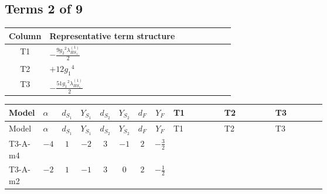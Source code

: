 \documentclass[8pt]{article}
\begin{document}
\begin{landscape}
\subsection*{Terms 2 of 9}
\begin{center}
\begin{tabular}{@{}c >{\raggedright\arraybackslash}p{0.82\linewidth}@{}}
\toprule
Column & Representative term structure \\
\midrule
T1 & \(\displaystyle -\frac{9 {g_2}^2 {\lambda_{HS_1}^{(1)}}}{2}\) \\
\midrule
T2 & \(\displaystyle +12 {g_1}^4\) \\
\midrule
T3 & \(\displaystyle -\frac{51 {g_1}^2 {\lambda_{HS_1}^{(1)}}}{2}\) \\
\midrule
\bottomrule
\end{tabular}
\end{center}
\smallskip
\tiny
\begin{longtable}{@{}llcccccc >{\raggedright\arraybackslash}p{0.21\linewidth} >{\raggedright\arraybackslash}p{0.21\linewidth} >{\raggedright\arraybackslash}p{0.21\linewidth}@{}}
\toprule
Model & $\alpha$ & $d_{S_1}$ & $Y_{S_1}$ & $d_{S_2}$ & $Y_{S_2}$ & $d_F$ & $Y_F$ & T1 & T2 & T3 \\
\midrule
\endfirsthead
\toprule
Model & $\alpha$ & $d_{S_1}$ & $Y_{S_1}$ & $d_{S_2}$ & $Y_{S_2}$ & $d_F$ & $Y_F$ & T1 & T2 & T3 \\
\midrule
\endhead
T3-A-m4 & $-4$ & $1$ & $-2$ & $3$ & $-1$ & $2$ & $-\frac{3}{2}$ & \scriptsize\adjustbox{max width=\linewidth}{$\begin{gathered} -\frac{9 {g_2}^2 {\lambda_{HS_1}^{(1)}}}{2}\end{gathered}$} & \scriptsize\adjustbox{max width=\linewidth}{$\begin{gathered} +12 {g_1}^4\end{gathered}$} & \scriptsize\adjustbox{max width=\linewidth}{$\begin{gathered} -\frac{51 {g_1}^2 {\lambda_{HS_1}^{(1)}}}{2}\end{gathered}$} \\
\midrule
T3-A-m2 & $-2$ & $1$ & $-1$ & $3$ & $0$ & $2$ & $-\frac{1}{2}$ & \scriptsize\adjustbox{max width=\linewidth}{$\begin{gathered} -\frac{9 {g_2}^2 {\lambda_{HS_1}^{(1)}}}{2}\end{gathered}$} & \scriptsize\adjustbox{max width=\linewidth}{$\begin{gathered} +3 {g_1}^4\end{gathered}$} & \scriptsize\adjustbox{max width=\linewidth}{$\begin{gathered} -\frac{15 {g_1}^2 {\lambda_{HS_1}^{(1)}}}{2}\end{gathered}$} \\

\end{longtable}
\end{landscape}
\end{document}
